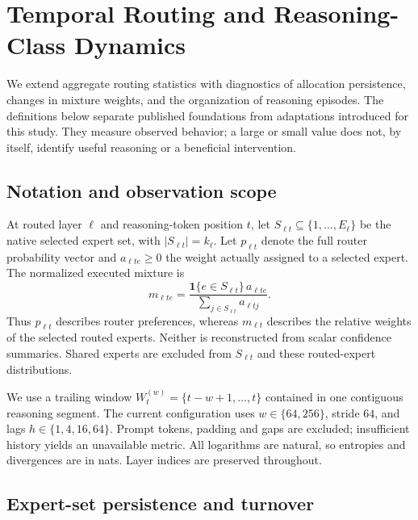 \section{Temporal Routing and Reasoning-Class Dynamics}
\label{sec:new-routing-metrics}

We extend aggregate routing statistics with diagnostics of allocation persistence,
changes in mixture weights, and the organization of reasoning episodes.
The definitions below separate published foundations from adaptations introduced
for this study. They measure observed behavior; a large or small value does not,
by itself, identify useful reasoning or a beneficial intervention.

\subsection{Notation and observation scope}

At routed layer $\ell$ and reasoning-token position $t$, let
$S_{\ell t}\subseteq\{1,\ldots,E_\ell\}$ be the native selected expert set,
with $|S_{\ell t}|=k_\ell$. Let $p_{\ell t}$ denote the full router probability
vector and $a_{\ell te}\geq0$ the weight actually assigned to a selected expert.
The normalized executed mixture is
\begin{equation}
 m_{\ell te}=
 \frac{\mathbf{1}\{e\in S_{\ell t}\}\,a_{\ell te}}
      {\sum_{j\in S_{\ell t}}a_{\ell tj}}.
 \label{eq:new-executed-mixture}
\end{equation}
Thus $p_{\ell t}$ describes router preferences, whereas $m_{\ell t}$ describes
the relative weights of the selected routed experts. Neither is reconstructed
from scalar confidence summaries. Shared experts are excluded from $S_{\ell t}$
and these routed-expert distributions.

We use a trailing window $W_t^{(w)}=\{t-w+1,\ldots,t\}$ contained in one
contiguous reasoning segment. The current configuration uses
$w\in\{64,256\}$, stride $64$, and lags $h\in\{1,4,16,64\}$.
Prompt tokens, padding and gaps are excluded; insufficient history yields an
unavailable metric. All logarithms are natural, so entropies and divergences are
in nats. Layer indices are preserved throughout.

\subsection{Expert-set persistence and turnover}

